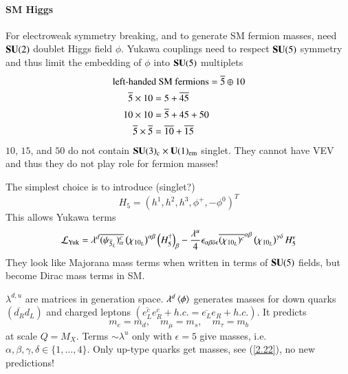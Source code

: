 \paragraph{SM Higgs}
For electroweak symmetry breaking, and to generate SM fermion masses, need $\mathbf{SU}(2)$ doublet Higgs field $\phi$. Yukawa couplings need to respect $\mathbf{SU}(5)$ symmetry and thus limit the embedding of $\phi$ into $\mathbf{SU}(5)$ multiplets
\begin{align}
   \text{left-handed SM fermions} &= \overline{5} \oplus 10 \notag\\
   \begin{split}
      \overline{5} \times 10 &= 5 + \overline{45} \\
      10 \times 10 &= \overline{5} + 45 + 50 \\
      \overline{5} \times \overline{5} &= \overline{10} + \overline{15}
   \end{split}
   \label{2.39}
\end{align}
$10$, $15$, and $50$ do not contain $\mathbf{SU}(3)_\text{c} \times \mathbf{U}(1)_\text{em}$ singlet. They cannot have VEV and thus they do not play role for fermion masses! 

The simplest choice is to introduce (singlet?)
\begin{equation}
   H_5 = (h^1, h^2, h^3, \phi^+, -\phi^0)^T
\end{equation}
This allows Yukawa terms
\begin{equation}
   \mathcal{L}_\text{Yuk} = \lambda^d \overline{(\psi_{\overline{5}_L})^c_\alpha} \left( \chi_{10_L} \right)^{\alpha\beta} \left( H^\dagger_5 \right)_\beta - \frac{\lambda^u}{4} \epsilon_{\alpha\beta\delta\epsilon} \overline{(\chi_{10_L})^c}^{\alpha\beta} \left( \chi_{10_L} \right)^{\gamma\delta} H_5^\epsilon \label{2.41}
\end{equation}
They look like Majorana mass terms when written in terms of $\mathbf{SU}(5)$ fields, but become Dirac mass terms in SM.

$\lambda^{d,u}$ are matrices in generation space. $\lambda^d \expval{\phi}$ generates masses for down quarks $(\overline{d_R}d_L)$ and charged leptons $(\overline{e^c_L}e^c_R + h.c. = \overline{e_L}e_R + h.c.)$. It predicts 
\begin{equation}
   m_e = m_d, \quad m_\mu = m_s, \quad m_\tau = m_b \label{2.42}
\end{equation}
at scale $Q=M_X$.
Terms $\sim \lambda^u$ only with $\epsilon=5$ give masses, i.e.~$\alpha,\beta,\gamma,\delta \in \{1,\dots, 4\}$. Only up-type quarks get masses, see (\ref{2.22}), no new predictions!

